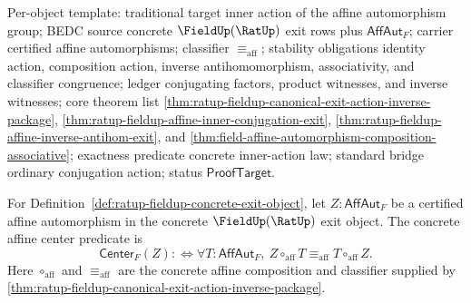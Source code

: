 Per-object template: traditional target inner action of the affine
automorphism group; BEDC source concrete $\FieldUp(\RatUp)$ exit rows plus
$\mathsf{AffAut}_F$; carrier certified affine automorphisms; classifier
$\equiv_{\mathrm{aff}}$; stability obligations identity action, composition
action, inverse antihomomorphism, associativity, and classifier congruence;
ledger conjugating factors, product witnesses, and inverse witnesses; core
theorem list
\autoref{thm:ratup-fieldup-canonical-exit-action-inverse-package},
\autoref{thm:ratup-fieldup-affine-inner-conjugation-exit},
\autoref{thm:ratup-fieldup-affine-inverse-antihom-exit}, and
\autoref{thm:field-affine-automorphism-composition-associative}; exactness
predicate concrete inner-action law; standard bridge ordinary conjugation
action; status $\mathsf{ProofTarget}$.

\begin{definition}
\label{def:ratup-fieldup-affine-center}
For Definition~\ref{def:ratup-fieldup-concrete-exit-object}, let
$Z:\mathsf{AffAut}_F$ be a certified affine automorphism in the concrete
$\FieldUp(\RatUp)$ exit object. The concrete affine center predicate is
$$
\mathsf{Center}_F(Z)
:\Longleftrightarrow
\forall T:\mathsf{AffAut}_F,\ 
Z\circ_{\mathrm{aff}}T\equiv_{\mathrm{aff}}T\circ_{\mathrm{aff}}Z.
$$
Here $\circ_{\mathrm{aff}}$ and $\equiv_{\mathrm{aff}}$ are the concrete affine
composition and classifier supplied by
\autoref{thm:ratup-fieldup-canonical-exit-action-inverse-package}.
\end{definition}

